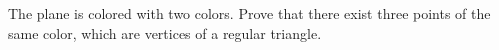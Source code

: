 The plane is colored with two colors. Prove that there exist three points of the same color, which are vertices of a regular triangle.
